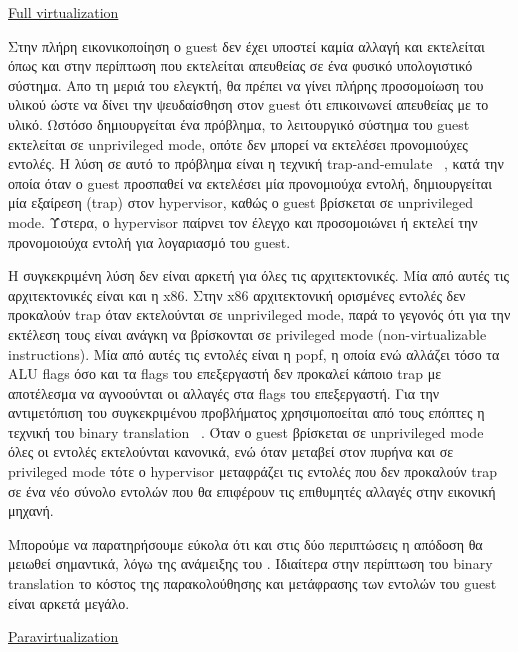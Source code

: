 \vspace{2ex}
\underline{Full virtualization}

\vspace{1ex}

Στην πλήρη εικονικοποίηση ο guest δεν έχει υποστεί καμία αλλαγή και εκτελείται
όπως και στην περίπτωση που εκτελείται απευθείας σε ένα φυσικό υπολογιστικό
σύστημα. Απο τη μεριά του ελεγκτή, θα πρέπει να γίνει πλήρης προσομοίωση του
υλικού ώστε να δίνει την ψευδαίσθηση στον guest ότι επικοινωνεί απευθείας με το
υλικό. Ωστόσο δημιουργείται ένα πρόβλημα, το λειτουργικό σύστημα του guest
εκτελείται σε unprivileged mode, οπότε δεν μπορεί να εκτελέσει προνομιούχες
εντολές. Η λύση σε αυτό το πρόβλημα είναι η τεχνική trap-and-emulate
~\cite{adams2006comparison}, κατά την οποία όταν ο guest προσπαθεί να εκτελέσει
μία προνομιούχα εντολή, δημιουργείται μία εξαίρεση (trap) στον hypervisor, καθώς
ο guest βρίσκεται σε unprivileged mode. Ύστερα, ο hypervisor παίρνει τον έλεγχο
και προσομοιώνει ή εκτελεί την προνομοιούχα εντολή για λογαριασμό του guest. 

H συγκεκριμένη λύση δεν είναι αρκετή για όλες τις αρχιτεκτονικές. Μία από αυτές
τις αρχιτεκτονικές είναι και η x86. Στην x86 αρχιτεκτονική ορισμένες εντολές
δεν προκαλούν trap όταν εκτελούνται σε unprivileged mode, παρά το γεγονός ότι
για την εκτέλεση τους είναι ανάγκη να βρίσκονται σε privileged mode
(non-virtualizable instructions). Μία από
αυτές τις εντολές είναι η popf, η οποία ενώ αλλάζει τόσο τα ALU flags όσο και τα
flags του επεξεργαστή δεν προκαλεί κάποιο trap με αποτέλεσμα να αγνοούνται οι
αλλαγές στα flags του επεξεργαστή. Για την αντιμετόπιση του συγκεκριμένου
προβλήματος χρησιμοποείται από τους επόπτες η τεχνική του binary translation
~\cite{adams2006comparison}. 
Όταν ο guest βρίσκεται σε unprivileged mode όλες οι εντολές εκτελούνται
κανονικά, ενώ όταν μεταβεί στον πυρήνα και σε privileged mode τότε ο hypervisor
μεταφράζει τις εντολές που δεν προκαλούν trap σε ένα νέο σύνολο εντολών που θα
επιφέρουν τις επιθυμητές αλλαγές στην εικονική μηχανή. 

Μπορούμε να παρατηρήσουμε εύκολα ότι και στις δύο περιπτώσεις η απόδοση θα
μειωθεί σημαντικά, λόγω της ανάμειξης του . Ιδιαίτερα στην περίπτωση
του binary translation το κόστος της παρακολούθησης και μετάφρασης των εντολών
του guest είναι αρκετά μεγάλο. 

\vspace{2ex}
\underline{Paravirtualization}

\vspace{1ex}

